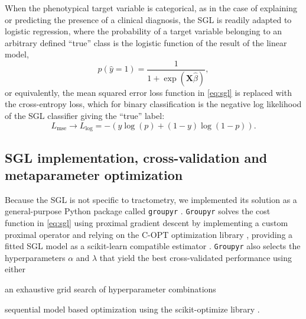 \documentclass[10pt,letterpaper]{article}
\begin{document}
When the phenotypical target variable is categorical, as in the case of
explaining or predicting the presence of a clinical diagnosis, the SGL is
readily adapted to logistic regression, where the probability of a target
variable belonging to an arbitrary defined ``true'' class is the logistic
function of the result of the linear model,
\begin{equation}
    p(\hat{y} = 1) = \frac{1}{1 + \exp(\mathbf{X} \hat{\beta})},
    \label{eq:logit}
\end{equation}
or equivalently, the mean squared error loss function in \cref{eq:sgl} is
replaced with the cross-entropy loss, which for binary classification is the
negative log likelihood of the SGL classifier giving the ``true'' label:
\begin{equation}
    L_{\text{mse}} \rightarrow L_{\log} =
    -\left(y \log(p) + (1 - y) \log(1 - p)\right).
    \label{eq:logloss}
\end{equation}

\subsection*{SGL implementation, cross-validation and metaparameter optimization}

Because the SGL is not specific to tractometry, we implemented its solution as
a general-purpose Python package called \texttt{groupyr} \cite{groupyr}.
\texttt{Groupyr} solves the cost function in \cref{eq:sgl} using proximal
gradient descent \cite{parikh2014proximal} by implementing a custom proximal
operator and relying on the C-OPT optimization library \cite{copt}, providing
a fitted SGL model as a scikit-learn compatible estimator \cite{sklearn_api}.
\texttt{Groupyr} also selects the hyperparameters $\alpha$ and $\lambda$ that
yield the best cross-validated performance using either
\begin{enumerate*}[%
    label=(\roman*),%
    before=\unskip{: },%
    itemjoin={{, }},%
    itemjoin*={{, or }}]
    \item an exhaustive grid search of hyperparameter combinations
    \item sequential model based optimization using the scikit-optimize
    library \cite{scikit_optimize}.
\end{enumerate*}
\end{document}
